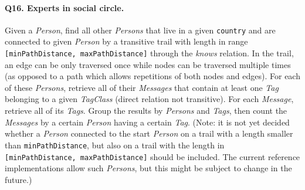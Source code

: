 \paragraph{\textbf{Q16}. Experts in social circle.}
Given a \emph{Person}, find all other \emph{Persons} that live in a
given \texttt{country} and are connected to given \emph{Person} by a
transitive trail with length in range
\texttt{{[}minPathDistance,\ maxPathDistance{]}} through the
\emph{knows} relation.
In the trail, an edge can be only traversed once while nodes can be
traversed multiple times (as opposed to a path which allows repetitions
of both nodes and edges).
For each of these \emph{Persons}, retrieve all of their \emph{Messages}
that contain at least one \emph{Tag} belonging to a given
\emph{TagClass} (direct relation not transitive). For each
\emph{Message}, retrieve all of its \emph{Tags}.
Group the results by \emph{Persons} and \emph{Tags}, then count the
\emph{Messages} by a certain \emph{Person} having a certain \emph{Tag}.
(Note: it is not yet decided whether a \emph{Person} connected to the
start \emph{Person} on a trail with a length smaller than
\texttt{minPathDistance}, but also on a trail with the length in
\texttt{{[}minPathDistance,\ maxPathDistance{]}} should be included. The
current reference implementations allow such \emph{Persons}, but this
might be subject to change in the future.)
